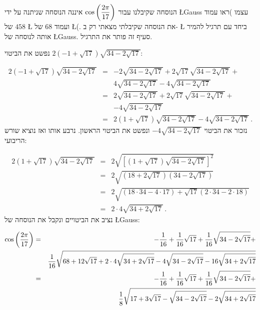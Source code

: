 הנוסחה שקיבלנו עבור 
$\cos\left(\displaystyle\frac{2\pi}{17}\right)$
איננה הנוסחה שניתנה על ידי
\L{Gauss}
עצמו
)ראו עמוד
$458$
של
\L{\cite{gauss}}
ועמוד
$68$
של
\L{\cite{jorg}}(.
את הנוסחה שקיבלתי מצאתי רק ב-%
\L{\cite{rike}}
ביחד עם תרגיל להמיר אותה לנוסחה של
\L{Gauss}.
סעיף זה פותר את התרגיל.

נפשט את הביטוי
$2(-1+\sqrt{17})\sqrt{34-2\sqrt{17}}$:

\begin{eqnarray*}
2(-1+\sqrt{17})\sqrt{34-2\sqrt{17}} &=&
-2\sqrt{34-2\sqrt{17}} +2\sqrt{17}\sqrt{34-2\sqrt{17}}+\\
&&4\sqrt{34-2\sqrt{17}}-4\sqrt{34-2\sqrt{17}}\\
&=&
2\sqrt{34-2\sqrt{17}} +2\sqrt{17}\sqrt{34-2\sqrt{17}}+\\
&&-4\sqrt{34-2\sqrt{17}}\\
&=&2(1+\sqrt{17})\sqrt{34-2\sqrt{17}}-4\sqrt{34-2\sqrt{17}}\,.
\end{eqnarray*}
נזכור את הביטוי
$-4\sqrt{34-2\sqrt{17}}$
ונפשט את הביטוי הראשון. נרבע אותו ואז נוציא שורש הריבועי:

\begin{eqnarray*}
2(1+\sqrt{17})\sqrt{34-2\sqrt{17}}&=&
2\sqrt{\left[(1+\sqrt{17})\sqrt{34-2\sqrt{17}}\right]^2}\\
&=&2\sqrt{(18+2\sqrt{17})(34-2\sqrt{17})}\\
&=&2\sqrt{(18\cdot 34-4\cdot17)+\sqrt{17}(2\cdot 34 - 2\cdot 18)}\\
&=&2\cdot 4\sqrt{34+2\sqrt{17}}\,.
\end{eqnarray*}
נציב את הביטויים ונקבל את הנוסחה של \L{Gauss}:

\begin{eqnarray*}
\cos\left(\displaystyle\frac{2\pi}{17}\right) &=& 
-\displaystyle\frac{1}{16}+\displaystyle\frac{1}{16}\sqrt{17} + 
     \displaystyle\frac{1}{16}\sqrt{34-2\sqrt{17}}
    + \\
    &&
     \displaystyle\frac{1}{16}\sqrt{
     68+12\sqrt{17} + 
     2\cdot 4\sqrt{34+2\sqrt{17}}-4\sqrt{34-2\sqrt{17}}
   -16
     \sqrt{34+2\sqrt{17}}
   }\\
&=&-\displaystyle\frac{1}{16}+\frac{1}{16}\sqrt{17} + 
     \displaystyle\frac{1}{16}\sqrt{34-2\sqrt{17}}
    + \\
    &&
     \displaystyle\frac{1}{8}\sqrt{
     17+3\sqrt{17} - 
     \sqrt{34-2\sqrt{17}}
   -2
     \sqrt{34+2\sqrt{17}}
   }
\end{eqnarray*}



